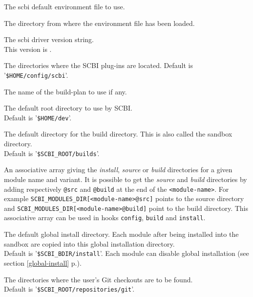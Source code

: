 \documentclass[a4paper,12pt,twoside]{article}
\let\olditem=\item
\def\myitem[#1]{\vspace{10pt}\olditem[#1]}
\newcommand{\code}[1]{\texttt{#1}}
\renewcommand{\emph}[1]{\textit{#1}}
\newcommand{\seeref}[1]{see section \ref{#1} p.\pageref{#1}}
\newcommand{\file}[1]{'{\texttt{#1}}'}
\begin{document}
\begin{description}[before=\let\item\myitem]
	\item[SCBI\_DEFAULT\_ENV] The scbi default environment file to use.

	\item[SCBI\_ENV\_DIR] The directory from where the environment file has been loaded.

	\item[SCBI\_VERSION] The scbi driver version string.
	\\This version is \version.

	\item[SCBI\_PLUGINS] The directories where the SCBI plug-ins are located.
	Default is \file{\$HOME/config/scbi}.

	\item[SCBI\_PLAN] The name of the build-plan to use if any.

	\item[SCBI\_ROOT] The default root directory to use by SCBI. \\
	Default is \file{\$HOME/dev}.

	\item[SCBI\_BDIR] The default directory for the build directory.  This is also called the sandbox directory. \\
	Default is \file{\$SCBI\_ROOT/builds}.

	\item[SCBI\_MODULES\_DIR{[<module-name>[@src|@build]]}] An associative array giving the \emph{install}, \emph{source} or \emph{build} directories for a given module name and variant. It is possible to get the \emph{source} and \emph{build} directories by adding respectively \code{@src} and \code{@build} at the end of the \code{<module-name>}. For example \code{SCBI\_MODULES\_DIR{[<module-name>@src]}} points to the source directory and \code{SCBI\_MODULES\_DIR{[<module-name>@build]}} point to the build directory. This associative array can be used in hooks \code{config}, \code{build} and \code{install}.

	\item[SCBI\_PREFIX] The default global install directory. Each module after being installed into the sandbox are copied into this global installation directory. \\Default is \file{\$SCBI\_BDIR/install}. Each module can disable global installation (\seeref{global-install}).

	\item[SCBI\_GIT\_REPO] The directories where the user's Git checkouts are to be found. \\ Default is \file{\$SCBI\_ROOT/repositories/git}.


\end{description}
\end{document}
